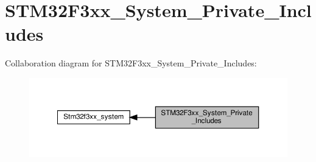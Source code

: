 \hypertarget{group__STM32F3xx__System__Private__Includes}{}\section{S\+T\+M32\+F3xx\+\_\+\+System\+\_\+\+Private\+\_\+\+Includes}
\label{group__STM32F3xx__System__Private__Includes}
Collaboration diagram for S\+T\+M32\+F3xx\+\_\+\+System\+\_\+\+Private\+\_\+\+Includes\+:\nopagebreak
\begin{figure}[H]
\begin{center}
\leavevmode
\includegraphics[width=350pt]{group__STM32F3xx__System__Private__Includes}
\end{center}
\end{figure}
